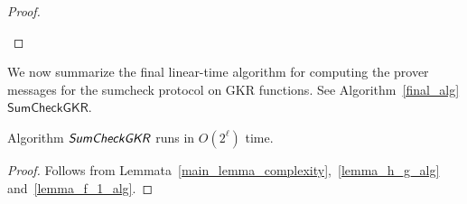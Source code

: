 {{\begin{proof}
\begin{figure}[t!]
\begin{algorithm}[H]
\begin{algorithmic}[1]
				\EndFor
			\end{algorithmic}
		\end{algorithm}
		
	\end{figure}	
	
\end{proof}	


We now summarize the final linear-time algorithm for computing the prover messages for the sumcheck protocol on GKR functions. See Algorithm~\ref{final_alg} $\textsf{SumCheckGKR}$.
\begin{theorem}
Algorithm $\textsf{\emph{SumCheckGKR}}$ runs in $O(2^\ell)$ time.
\end{theorem}
\begin{proof}
Follows from Lemmata~\ref{main_lemma_complexity},~\ref{lemma_h_g_alg} and~\ref{lemma_f_1_alg}.
\end{proof}

}}
